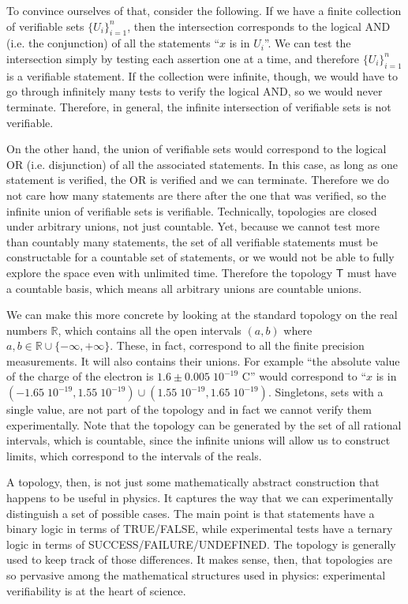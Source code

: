 \documentclass[12pt]{iopart}
\begin{document}
To convince ourselves of that, consider the following. If we have a finite collection of verifiable sets $\{U_i\}_{i=1}^n$, then the intersection corresponds to the logical AND (i.e. the conjunction) of all the statements ``$x$ is in $U_i$''. We can test the intersection simply by testing each assertion one at a time, and therefore $\{U_i\}_{i=1}^n$ is a verifiable statement. If the collection were infinite, though, we would have to go through infinitely many tests to verify the logical AND, so we would never terminate. Therefore, in general, the infinite intersection of verifiable sets is not verifiable.

On the other hand, the union of verifiable sets would correspond to the logical OR (i.e. disjunction) of all the associated statements. In this case, as long as one statement is verified, the OR is verified and we can terminate. Therefore we do not care how many statements are there after the one that was verified, so the infinite union of verifiable sets is verifiable. Technically, topologies are closed under arbitrary unions, not just countable. Yet, because we cannot test more than countably many statements, the set of all verifiable statements must be constructable for a countable set of statements, or we would not be able to fully explore the space even with unlimited time. Therefore the topology $\mathsf{T}$ must have a countable basis, which means all arbitrary unions are countable unions. 

We can make this more concrete by looking at the standard topology on the real numbers $\mathbb{R}$, which contains all the open intervals $(a,b)$ where $a,b \in \mathbb{R}\cup\{-\infty, +\infty\}$. These, in fact, correspond to all the finite precision measurements. It will also contains their unions. For example ``the absolute value of the charge of the electron is $1.6 \pm 0.005\;10^{-19}$ C'' would correspond to ``$x$ is in $(-1.65 \;10^{-19}, 1.55 \;10^{-19})\cup(1.55 \;10^{-19},1.65 \;10^{-19})$. Singletons, sets with a single value, are not part of the topology and in fact we cannot verify them experimentally. Note that the topology can be generated by the set of all rational intervals, which is countable, since the infinite unions will allow us to construct limits, which correspond to the intervals of the reals.

A topology, then, is not just some mathematically abstract construction that happens to be useful in physics. It captures the way that we can experimentally distinguish a set of possible cases. The main point is that statements have a binary logic in terms of TRUE/FALSE, while experimental tests have a ternary logic in terms of SUCCESS/FAILURE/UNDEFINED. The topology is generally used to keep track of those differences. It makes sense, then, that topologies are so pervasive among the mathematical structures used in physics: experimental verifiability is at the heart of science.
\end{document}
